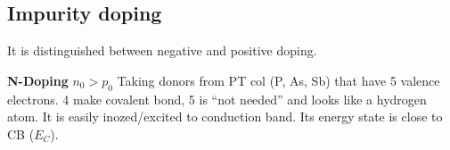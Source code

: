 \documentclass[a4paper, fontsize=8pt, landscape, DIV=1]{scrartcl}
\begin{document}
\begin{multicols*}{4}

  \subsection{Impurity doping}
  It is distinguished between negative and positive doping.
  
  \textbf{N-Doping} $n_0>p_0$
  Taking donors from PT col  (P, As, Sb) that have 5 valence electrons. 4 make covalent bond, 5 is ``not needed'' and looks like a hydrogen atom. It is easily inozed/excited to conduction band. Its energy state is close to CB ($E_C$).
  \attention
  

\end{multicols*}
\end{document}
